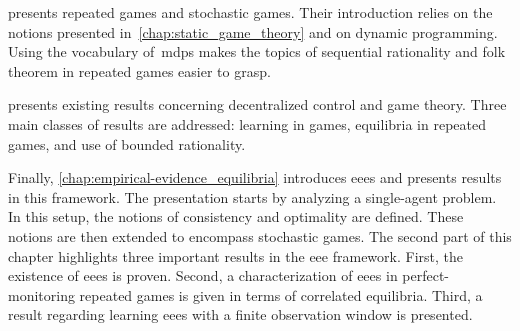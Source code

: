  presents repeated games and stochastic games.
Their introduction relies on the notions presented in~\cref{chap:static_game_theory} and on dynamic programming.
Using the vocabulary of~\acp{mdp} makes the topics of sequential rationality and folk theorem in repeated games easier to grasp.

 presents existing results concerning decentralized control and game theory.
Three main classes of results are addressed: learning in games, equilibria in repeated games, and use of bounded rationality.

Finally, \cref{chap:empirical-evidence_equilibria} introduces \acp{eee} and presents results in this framework.
The presentation starts by analyzing a single-agent problem.
In this setup, the notions of consistency and optimality are defined.
These notions are then extended to encompass stochastic games.
The second part of this chapter highlights three important results in the \ac{eee} framework.
First, the existence of \acp{eee} is proven.
Second, a characterization of \acp{eee} in perfect-monitoring repeated games is given in terms of correlated equilibria.
Third, a result regarding learning \acp{eee} with a finite observation window is presented.
